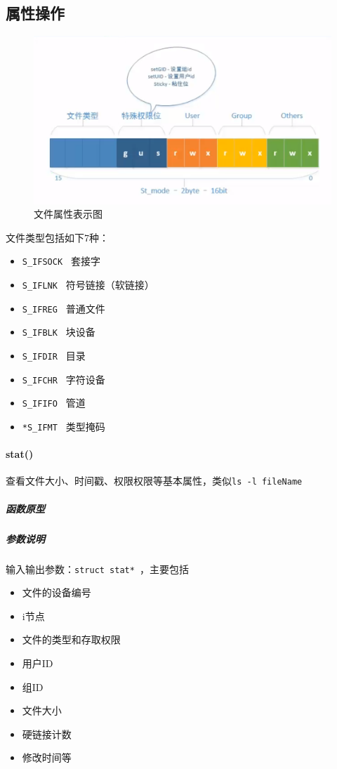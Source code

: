 \documentclass[UTF8,a4paper,12pt]{ctexbook}
\begin{document}
		\subsection{属性操作}
			\begin{figure}[H]
				\centering
				\includegraphics[scale=0.5]{fileStat_mode.png}
				\caption{文件属性表示图}
				\label{st_mode}
			\end{figure}
		
		文件类型包括如下7种：
		\begin{itemize}[itemindent = 1em]
			\item \verb|S_IFSOCK | 套接字
			\item \verb|S_IFLNK | 符号链接（软链接）
			\item \verb|S_IFREG | 普通文件
			\item \verb|S_IFBLK | 块设备
			\item \verb|S_IFDIR | 目录
			\item \verb|S_IFCHR | 字符设备
			\item \verb|S_IFIFO | 管道
			\item \verb|*S_IFMT | 类型掩码
		\end{itemize}
			
		\paragraph{stat()}查看文件大小、时间戳、权限权限等基本属性，类似\verb|ls -l fileName|
			\subparagraph{函数原型}
					
			\subparagraph{参数说明}
				输入输出参数：\verb|struct stat* |，主要包括
				\begin{itemize}[itemindent = 1em]
					\item 文件的设备编号
					\item i节点
					\item 文件的类型和存取权限
					\item 用户ID
					\item 组ID
					\item 文件大小
					\item 硬链接计数
					\item 修改时间等
				\end{itemize}
			
\end{document}
